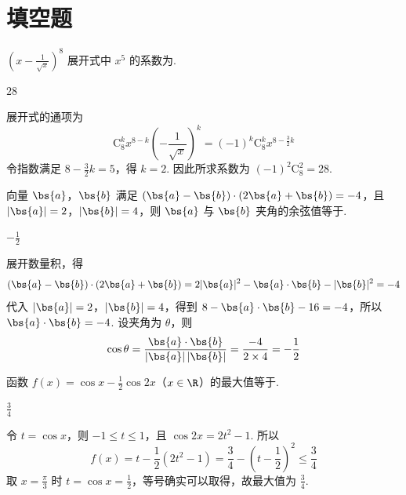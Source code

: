 \section{填空题}
\begin{problem}
\(\left(x - \frac{1}{\sqrt{x}}\right)^8\) 展开式中 \(x^5\) 的系数为\fillinblank{}.
\end{problem}

\begin{answer}
\(28\)
\end{answer}

\begin{solution}
展开式的通项为
\[
\mathrm C_{8}^{k}x^{8-k}\left(-\frac1{\sqrt{x}}\right)^k
=(-1)^k\mathrm C_{8}^{k}x^{8-\frac32k}
\]
令指数满足 \(8-\frac32k=5\)，得 \(k=2\). 因此所求系数为 \((-1)^2\mathrm C_{8}^{2}=28\).
\end{solution}

\begin{problem}
向量 \(\bs{a}\)，\(\bs{b}\) 满足 \(\left(\bs{a} - \bs{b}\right) \cdot \left(2\bs{a} + \bs{b}\right) = -4\)，且 \(|\bs{a}| = 2\)，\(|\bs{b}| = 4\)，则 \(\bs{a}\) 与 \(\bs{b}\) 夹角的余弦值等于\fillinblank{}.
\end{problem}

\begin{answer}
\(-\frac12\)
\end{answer}

\begin{solution}
展开数量积，得
\[
(\bs{a}-\bs{b})\cdot(2\bs{a}+\bs{b})
=2|\bs{a}|^2-\bs{a}\cdot\bs{b}-|\bs{b}|^2=-4
\]
代入 \(|\bs{a}|=2\)，\(|\bs{b}|=4\)，得到 \(8-\bs{a}\cdot\bs{b}-16=-4\)，所以 \(\bs{a}\cdot\bs{b}=-4\). 设夹角为 \(\theta\)，则
\[
\cos\theta=\frac{\bs{a}\cdot\bs{b}}{|\bs{a}|\,|\bs{b}|}=\frac{-4}{2\times4}=-\frac12
\]
\end{solution}

\begin{problem}
函数 \(f(x) = \cos x - \frac{1}{2}\cos 2x\)（\(x \in \R\)）的最大值等于\fillinblank{}.
\end{problem}

\begin{answer}
\(\frac34\)
\end{answer}

\begin{solution}
令 \(t=\cos x\)，则 \(-1\leqslant t\leqslant1\)，且 \(\cos2x=2t^2-1\). 所以
\[
f(x)=t-\frac12(2t^2-1)=\frac34-\left(t-\frac12\right)^2\leqslant\frac34
\]
取 \(x=\frac{\pi}{3}\) 时 \(t=\cos x=\frac12\)，等号确实可以取得，故最大值为 \(\frac34\).
\end{solution}

